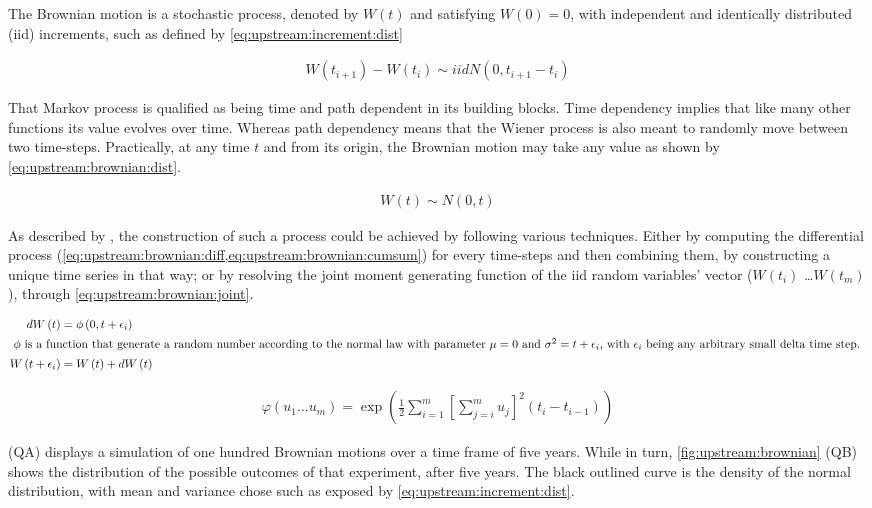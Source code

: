 \documentclass[a4paper, 12pt]{report}
\newcommand{\Bm}{W\left(t\right)}
\begin{document}
The Brownian motion is a stochastic process, denoted by $\Bm$ and satisfying $W(0) = 0$, with independent and identically distributed (iid) increments, such as defined by \cref{eq:upstream:increment:dist}

\begin{align}
W(t_{i+1}) - W(t_i) \sim
  iid N \left(0, t_{i+1} - t_i\right) \label{eq:upstream:increment:dist}
\end{align}

That Markov process is qualified as being time and path dependent in its building blocks. Time dependency implies that like many other functions its value evolves over time. 
Whereas path dependency means that the Wiener process is also meant to randomly move between two time-steps.
Practically, at any time $t$ and from its origin, the Brownian motion may take any value as shown by \cref{eq:upstream:brownian:dist}.

\begin{align}
\Bm \sim N(0, t) \label{eq:upstream:brownian:dist}
\end{align}

As described by \citet{shreve}, the construction of such a process could be achieved by following various techniques. Either by computing the differential process (\cref{eq:upstream:brownian:diff,eq:upstream:brownian:cumsum}) for every time-steps and then combining them, by constructing a unique time series in that way; or by resolving the joint moment generating function of the iid random variables' vector ($W(t_i)$ \ldots $W(t_m)$), through \cref{eq:upstream:brownian:joint}.

\begin{align}
  d\Bm &= \phi \left(0, t + \epsilon_i \right) \label{eq:upstream:brownian:diff} \\
  \intertext{
  $\phi$ is a function that generate a random number according to the normal law with parameter $\mu = 0$ and $\sigma^2 = t + \epsilon_i$, with $\epsilon_i$ being any arbitrary small delta time step.
  }
  W\left(t + \epsilon_i\right) &= \Bm + d\Bm \label{eq:upstream:brownian:cumsum}
\end{align}

\begin{align}
  \varphi\left(u_1 \ldots u_m\right) = \exp{\left( \frac{1}{2} \sum_{i = 1}^m \left[ \sum_{j = i}^m u_j \right]^2 \left( t_i - t_{i-1} \right) \right)} \label{eq:upstream:brownian:joint}
\end{align}

 (QA) displays a simulation of one hundred Brownian motions over a time frame of five years. While in turn, \cref{fig:upstream:brownian} (QB) shows the distribution of the possible outcomes of that experiment, after five years. The black outlined curve is the density of the normal distribution, with mean and variance chose such as exposed by \cref{eq:upstream:increment:dist}.
\end{document}
